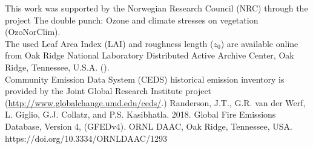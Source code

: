 \documentclass[gmd, manuscript]{copernicus}
\begin{document}


\begin{acknowledgements}
  This work was supported by the Norwegian Research Council (NRC) through the project The double punch: Ozone and climate stresses on vegetation (OzoNorClim).\\
  The used Leaf Area Index (LAI) and roughness length ($z_0$) are available online from Oak Ridge National Laboratory Distributed Active Archive Center, Oak Ridge, Tennessee, U.S.A. ().\\
  Community Emission Data System (CEDS) historical emission inventory is provided by the Joint Global Research Institute project (\url{http://www.globalchange.umd.edu/ceds/}.)
  Randerson, J.T., G.R. van der Werf, L. Giglio, G.J. Collatz, and P.S. Kasibhatla. 2018. Global Fire Emissions Database, Version 4, (GFEDv4). ORNL DAAC, Oak Ridge, Tennessee, USA. https://doi.org/10.3334/ORNLDAAC/1293
\end{acknowledgements}










\end{document}
